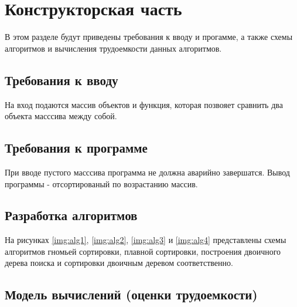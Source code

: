 \chapter{Конструкторская часть}
В этом разделе будут приведены требования к вводу и прогамме, а также схемы алгоритмов и вычисления трудоемкости данных алгоритмов.

\section{Требования к вводу}
На вход подаются массив объектов и функция, которая позвояет сравнить два объекта масссива между собой.

\section{Требования к программе}
При вводе пустого масссива программа не должна аварийно завершатся. Вывод программы - отсортированый по возрастанию массив.

\section{Разработка алгоритмов}

На рисунках \ref{img:alg1}, \ref{img:alg2}, \ref{img:alg3} и \ref{img:alg4} представлены схемы алгоритмов гномьей сортировки, плавной сортировки, построения двоичного дерева поиска и сортировки двоичным деревом соответственно.

\newpage
{}

\newpage
{}

\newpage
{}

\newpage
{}

\section{Модель вычислений (оценки трудоемкости)}

